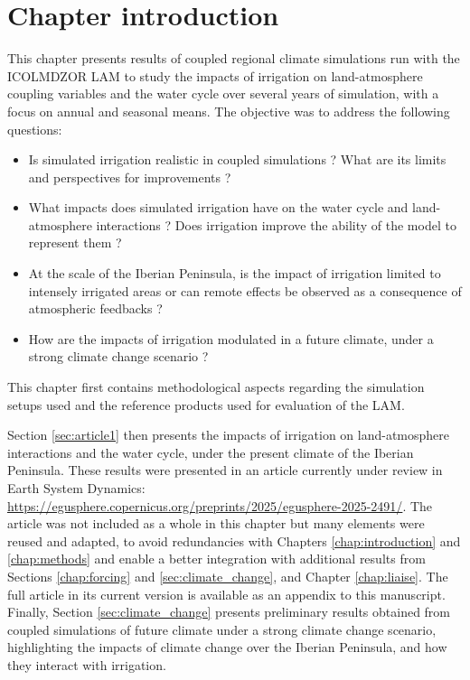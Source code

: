 \section{Chapter introduction}

This chapter presents results of coupled regional climate simulations run with the ICOLMDZOR LAM to study the impacts of irrigation on land-atmosphere coupling variables and the water cycle over several years of simulation, with a focus on annual and seasonal means. 
The objective was to address the following questions:
\begin{itemize}
    \item Is simulated irrigation realistic in coupled simulations ? What are its limits and perspectives for improvements ?
    \item What impacts does simulated irrigation have on the water cycle and land-atmosphere interactions ? Does irrigation improve the ability of the model to represent them ?
    \item At the scale of the Iberian Peninsula, is the impact of irrigation limited to intensely irrigated areas or can remote effects be observed as a consequence of atmospheric feedbacks ?
    \item How are the impacts of irrigation modulated in a future climate, under a strong climate change scenario ?
\end{itemize}

This chapter first contains methodological aspects regarding the simulation setups used and the reference products used for evaluation of the LAM. 

Section \ref{sec:article1} then presents the impacts of irrigation on land-atmosphere interactions and the water cycle, under the present climate of the Iberian Peninsula. These results were presented in an article currently under review in Earth System Dynamics: \url{https://egusphere.copernicus.org/preprints/2025/egusphere-2025-2491/}.
The article was not included as a whole in this chapter but many elements were reused and adapted, to avoid redundancies with Chapters \ref{chap:introduction} and \ref{chap:methods} and enable a better integration with additional results from Sections \ref{chap:forcing} and \ref{sec:climate_change}, and Chapter \ref{chap:liaise}. The full article in its current version is available as an appendix to this manuscript.
Finally, Section \ref{sec:climate_change} presents preliminary results obtained from coupled simulations of future climate under a strong climate change scenario, highlighting the impacts of climate change over the Iberian Peninsula, and how they interact with irrigation.


